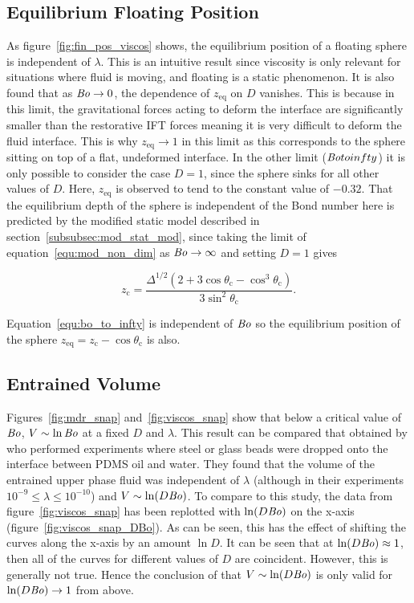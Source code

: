 \documentclass[12pt]{article}
\newcommand\Bo{\mbox{\textit{Bo}}}  %
\begin{document}
\subsection{Equilibrium Floating Position}
\label{subsec:dis_float_pos}

As figure~\ref{fig:fin_pos_viscos} shows, the equilibrium position of a floating sphere is independent of $\lambda$. This is an intuitive result since viscosity is only relevant for situations where fluid is moving, and floating is a static phenomenon. It is also found that as $\Bo \to 0$, the dependence of $z_{\text{eq}}$ on $D$ vanishes. This is because in this limit, the gravitational forces acting to deform the interface are significantly smaller than the restorative IFT forces meaning it is very difficult to deform the fluid interface. This is why $z_{\text{eq}} \to 1$ in this limit as this corresponds to the sphere sitting on top of a flat, undeformed interface. In the other limit ($\Bo to infty$) it is only possible to consider the case $D = 1$, since the sphere sinks for all other values of $D$. Here, $z_{\text{eq}}$ is observed to tend to the constant value of $-0.32$. That the equilibrium depth of the sphere is independent of the Bond number here is predicted by the modified static model described in section~\ref{subsubsec:mod_stat_mod}, since taking the limit of equation~\ref{equ:mod_non_dim} as $\Bo \to \infty$ and setting $D = 1$ gives

\begin{equation}
\label{equ:bo_to_infty}
z_{\text{c}} = \frac{\Delta^{1/2} (2 + 3 \cos \theta_{\text{c}} - \cos^{3} \theta_{\text{c}})}{3 \sin^{2} \theta_{\text{c}}}.
\end{equation}

Equation~\ref{equ:bo_to_infty} is independent of $\Bo$ so the equilibrium position of the sphere $z_{\text{eq}} = z_{\text{c}} - \cos \theta_{\text{c}}$ is also. 

\subsection{Entrained Volume}
\label{subsec:dis_ent_vol}

Figures~\ref{fig:mdr_snap} and~\ref{fig:viscos_snap} show that below a critical value of $\Bo$, $V \sim \ln \Bo$ at a fixed $D$ and $\lambda$. This result can be compared that obtained by \citet{Pitois99} who performed experiments where steel or glass beads were dropped onto the interface between PDMS oil and water. They found that the volume of the entrained upper phase fluid was independent of $\lambda$ (although in their experiments $10^{-9} \leq \lambda \leq 10^{-10}$) and $V \sim \ln(D \Bo)$. To compare to this study, the data from figure~\ref{fig:viscos_snap} has been replotted with $\ln(D \Bo)$ on the x-axis (figure~\ref{fig:viscos_snap_DBo}). As can be seen, this has the effect of shifting the curves along the x-axis by an amount $\ln D$. It can be seen that at $\ln(D \Bo) \approx 1$, then all of the curves for different values of $D$ are coincident. However, this is generally not true. Hence the conclusion of \citet{Pitois99} that $V \sim \ln(D \Bo)$ is only valid for $\ln(D \Bo) \to 1$ from above. 
\end{document}
